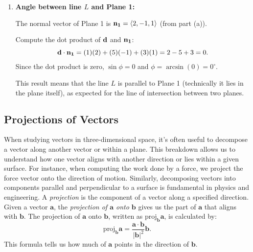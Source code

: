 \begin{example}
\begin{solution}
\begin{enumerate}
\begin{enumerate}
        \noindent In curly bracket notation, this can be written as:
        \[
        \left\{
        \begin{array}{l}
            x = -\frac{1}{3} + t, \\
            y = -\frac{11}{3} + 5t, \\
            z = 3t
        \end{array}
        \right. \quad \text{for } t \in \mathbb{R}.
        \]
    \end{enumerate}
    
    \item \textbf{Angle between line \( L \) and Plane 1:}
    
    \noindent The normal vector of Plane 1 is \( \vb{n_1} = \langle 2, -1, 1 \rangle \) (from part (a)).
    
    Compute the dot product of \( \vb{d} \) and \( \vb{n_1} \):
    \[
    \vb{d} \cdot \vb{n_1} = (1)(2) + (5)(-1) + (3)(1) = 2 - 5 + 3 = 0.
    \]
    Since the dot product is zero, \( \sin \phi = 0 \) and \( \phi = \arcsin(0) = 0^\circ \).
    
    \noindent This result means that the line \( L \) is parallel to Plane 1 (technically it lies in the plane itself), as expected for the line of intersection between two planes.
    
\end{enumerate}
\end{solution}
\end{example}
\exampleline





\subsection*{Projections of Vectors} 

\noindent When studying vectors in three-dimensional space, it’s often useful to decompose a vector along another vector or within a plane. This breakdown allows us to understand how one vector aligns with another direction or lies within a given surface. For instance, when computing the work done by a force, we project the force vector onto the direction of motion. Similarly, decomposing vectors into components parallel and perpendicular to a surface is fundamental in physics and engineering. A \textit{projection} is the component of a vector along a specified direction. Given a vector \( \mathbf{a} \), the \textit{projection of \( \mathbf{a} \) onto \( \mathbf{b} \)} gives us the part of \( \mathbf{a} \) that aligns with \( \mathbf{b} \). The projection of \( \mathbf{a} \) onto \( \mathbf{b} \), written as \( \text{proj}_{\mathbf{b}} \mathbf{a} \), is calculated by:
\[
\text{proj}_{\mathbf{b}} \mathbf{a} = \frac{\mathbf{a} \cdot \mathbf{b}}{|\mathbf{b}|^2} \mathbf{b}.
\]
This formula tells us how much of \( \mathbf{a} \) points in the direction of \( \mathbf{b} \).



